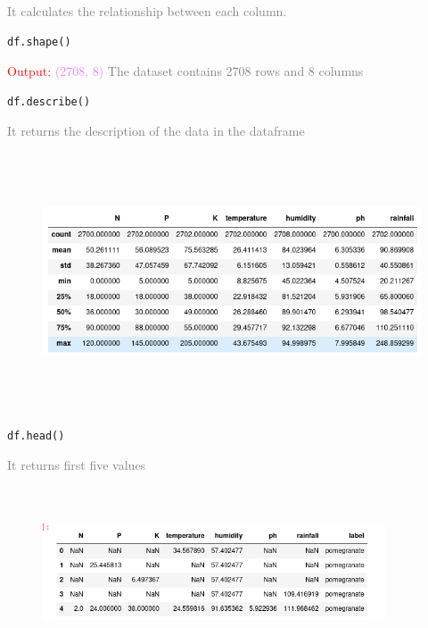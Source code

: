 \textcolor{gray}{\hspace{0.5cm}It calculates the relationship between each column.}
\newline
\begin{lstlisting}[language=Python]
df.shape()
\end{lstlisting}
\hspace{2in}\textcolor{red}{Output:}
\newline
\hspace{2in}\textcolor{violet}{(2708, 8)}
\newline
\textcolor{gray}{\hspace{0.5cm}The dataset contains 2708 rows and 8 columns}
\newline
\begin{lstlisting}[language=Python]
df.describe()
\end{lstlisting}
\newline
\textcolor{gray}{\hspace{0.5cm}It returns the description of the data in the dataframe}
\begin{figure}[ht]
    \centering
    \includegraphics[width=5in,height=3in]{describe.png}
    \label{fig:data}
\end{figure}

\vspace{3\baselineskip}
 \begin{lstlisting}[language=Python]
df.head()
\end{lstlisting}
\newline
\textcolor{gray}{\hspace{0.5cm}It returns first five values}
\begin{figure}[ht]
    \centering
    \includegraphics[width=4in,height=2in]{head.png}
    \label{fig:data}
\end{figure}
 
